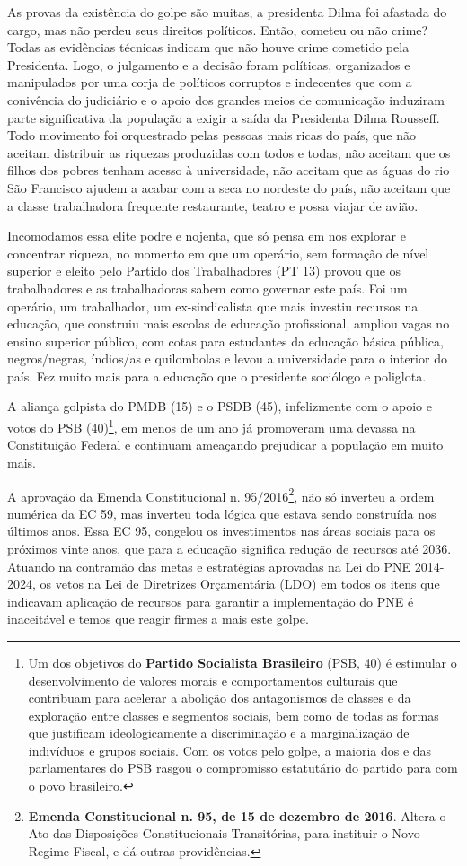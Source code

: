 As provas da existência do golpe são muitas, a presidenta Dilma foi
afastada do cargo, mas não perdeu seus direitos políticos. Então,
cometeu ou não crime? Todas as evidências técnicas indicam que não houve
crime cometido pela Presidenta. Logo, o julgamento e a decisão foram
políticas, organizados e manipulados por uma corja de políticos
corruptos e indecentes que com a conivência do judiciário e o apoio dos
grandes meios de comunicação induziram parte significativa da população
a exigir a saída da Presidenta Dilma Rousseff. Todo movimento foi
orquestrado pelas pessoas mais ricas do país, que não aceitam distribuir
as riquezas produzidas com todos e todas, não aceitam que os filhos dos
pobres tenham acesso à universidade, não aceitam que as águas do rio São
Francisco ajudem a acabar com a seca no nordeste do país, não aceitam
que a classe trabalhadora frequente restaurante, teatro e possa viajar
de avião.

Incomodamos essa elite podre e nojenta, que só pensa em nos explorar e
concentrar riqueza, no momento em que um operário, sem formação de nível
superior e eleito pelo Partido dos Trabalhadores (PT 13) provou que os
trabalhadores e as trabalhadoras sabem como governar este país. Foi um
operário, um trabalhador, um ex-sindicalista que mais investiu recursos
na educação, que construiu mais escolas de educação profissional,
ampliou vagas no ensino superior público, com cotas para estudantes da
educação básica pública, negros/negras, índios/as e quilombolas e levou
a universidade para o interior do país. Fez muito mais para a educação
que o presidente sociólogo e poliglota.

A aliança golpista do PMDB (15) e o PSDB (45), infelizmente com o apoio
e votos do PSB (40)\footnote{Um dos objetivos do \textbf{Partido
  Socialista Brasileiro} (PSB, 40) é estimular o desenvolvimento de
  valores morais e comportamentos culturais que contribuam para acelerar
  a abolição dos antagonismos de classes e da exploração entre classes e
  segmentos sociais, bem como de todas as formas que justificam
  ideologicamente a discriminação e a marginalização de indivíduos e
  grupos sociais. Com os votos pelo golpe, a maioria dos e das
  parlamentares do PSB rasgou o compromisso estatutário do partido para
  com o povo brasileiro.}, em menos de um ano já promoveram uma devassa
na Constituição Federal e continuam ameaçando prejudicar a população em
muito mais.

A aprovação da Emenda Constitucional n. 95/2016\footnote{\textbf{Emenda
  Constitucional n. 95, de 15 de dezembro de 2016}. Altera o Ato das
  Disposições Constitucionais Transitórias, para instituir o Novo Regime
  Fiscal, e dá outras providências.}, não só inverteu a ordem numérica
da EC 59, mas inverteu toda lógica que estava sendo construída nos
últimos anos. Essa EC 95, congelou os investimentos nas áreas sociais
para os próximos vinte anos, que para a educação significa redução de
recursos até 2036. Atuando na contramão das metas e estratégias
aprovadas na Lei do PNE 2014-2024, os vetos na Lei de Diretrizes
Orçamentária (LDO) em todos os itens que indicavam aplicação de recursos
para garantir a implementação do PNE é inaceitável e temos que reagir
firmes a mais este golpe.

